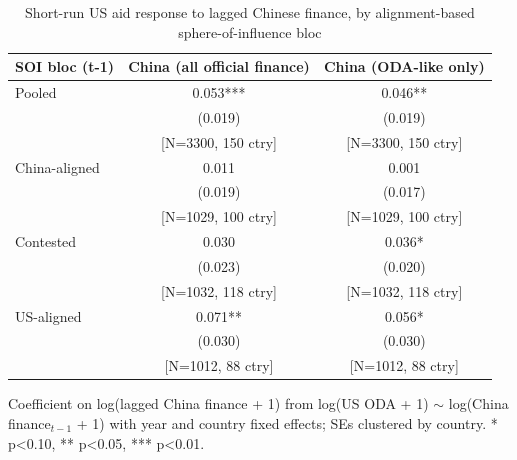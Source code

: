 \begin{table}[htbp]
\centering
\caption{Short-run US aid response to lagged Chinese finance, by alignment-based sphere-of-influence bloc}
\label{tab:soi}
\begin{tabular}{lcc}
\toprule
SOI bloc (t-1) & China (all official finance) & China (ODA-like only) \\
\midrule
Pooled & 0.053*** & 0.046** \\
 & (0.019) & (0.019) \\
 & [N=3300, 150 ctry] & [N=3300, 150 ctry] \\[2pt]
China-aligned & 0.011 & 0.001 \\
 & (0.019) & (0.017) \\
 & [N=1029, 100 ctry] & [N=1029, 100 ctry] \\[2pt]
Contested & 0.030 & 0.036* \\
 & (0.023) & (0.020) \\
 & [N=1032, 118 ctry] & [N=1032, 118 ctry] \\[2pt]
US-aligned & 0.071** & 0.056* \\
 & (0.030) & (0.030) \\
 & [N=1012, 88 ctry] & [N=1012, 88 ctry] \\[2pt]
\bottomrule
\end{tabular}
\begin{minipage}{0.9\textwidth}
\vspace{4pt}
\footnotesize Coefficient on log(lagged China finance + 1) from
log(US ODA + 1) $\sim$ log(China finance$_{t-1}$ + 1) with year and
country fixed effects; SEs clustered by country. * p<0.10, ** p<0.05, *** p<0.01.
\end{minipage}
\end{table}
